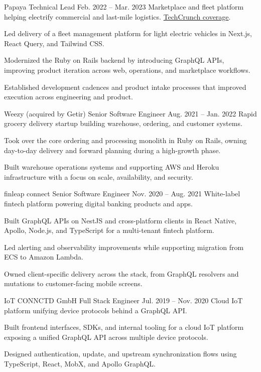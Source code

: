 \ResumeJob
  {Papaya}
  {Technical Lead}
  {Feb. 2022 -- Mar. 2023}
  {Marketplace and fleet platform helping electrify commercial and last-mile logistics. \href{https://techcrunch.com/2022/09/27/papaya-wants-to-help-electrify-last-mile-logistics-in-europe/}{TechCrunch coverage}.}
\begin{ResumeList}
  \item Led delivery of a fleet management platform for light electric vehicles in Next.js, React Query, and Tailwind CSS.
  \item Modernized the Ruby on Rails backend by introducing GraphQL APIs, improving product iteration across web, operations, and marketplace workflows.
  \item Established development cadences and product intake processes that improved execution across engineering and product.
\end{ResumeList}

\ResumeJob
  {Weezy (acquired by Getir)}
  {Senior Software Engineer}
  {Aug. 2021 -- Jan. 2022}
  {Rapid grocery delivery startup building warehouse, ordering, and customer systems.}
\begin{ResumeList}
  \item Took over the core ordering and processing monolith in Ruby on Rails, owning day-to-day delivery and forward planning during a high-growth phase.
  \item Built warehouse operations systems and supporting AWS and Heroku infrastructure with a focus on scale, availability, and security.
\end{ResumeList}

\ResumeJob
  {finleap connect}
  {Senior Software Engineer}
  {Nov. 2020 -- Aug. 2021}
  {White-label fintech platform powering digital banking products and apps.}
\begin{ResumeList}
  \item Built GraphQL APIs on NestJS and cross-platform clients in React Native, Apollo, Node.js, and TypeScript for a multi-tenant fintech platform.
  \item Led alerting and observability improvements while supporting migration from ECS to Amazon Lambda.
  \item Owned client-specific delivery across the stack, from GraphQL resolvers and mutations to customer-facing mobile screens.
\end{ResumeList}

\ResumeJob
  {IoT CONNCTD GmbH}
  {Full Stack Engineer}
  {Jul. 2019 -- Nov. 2020}
  {Cloud IoT platform unifying device protocols behind a GraphQL API.}
\begin{ResumeList}
  \item Built frontend interfaces, SDKs, and internal tooling for a cloud IoT platform exposing a unified GraphQL API across multiple device protocols.
  \item Designed authentication, update, and upstream synchronization flows using TypeScript, React, MobX, and Apollo GraphQL.
\end{ResumeList}

